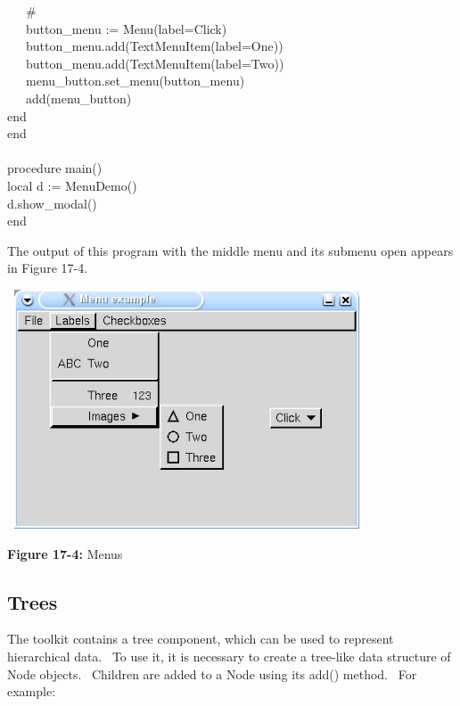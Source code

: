 {\>   \ \ \ \# \\
\>   \ \ \ button\_menu :=
Menu({\textquotedbl}label=Click{\textquotedbl}) \\
\>   \ \ \ button\_menu.add(TextMenuItem({\textquotedbl}label=One{\textquotedbl})) \\
\>   \ \ \ button\_menu.add(TextMenuItem({\textquotedbl}label=Two{\textquotedbl})) \\
\>   \ \ \ menu\_button.set\_menu(button\_menu) \\
\>   \ \ \ add(menu\_button) \\
\>   end \\
end \\
\ \\
procedure main() \\
\>   local d := MenuDemo() \\
\>   d.show\_modal() \\
end
}


\bigskip

The output of this program with the middle menu and its submenu open
appears in Figure 17-4.\\

\begin{center}
\includegraphics[width=4.2043in,height=2.7925in]{ub-img/ub-img53.jpg}
\end{center}

{\sffamily\bfseries Figure 17-4:}
{\sffamily Menus}

\subsection{Trees}

The toolkit contains a tree component, which can be used to represent
hierarchical data. \ To use it, it is necessary to create a tree-like
data structure of \textsf{Node} objects. \ Children are added to a
\textsf{Node} using its \textsf{add()} method. \ For example:

